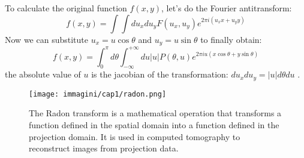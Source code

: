 To calculate the original function \( f(x,y) \), let's do the Fourier antitransform: 
\begin{equation}
    f(x,y) = \int \int du_x du_y F(u_x, u_y) e^{2\pi i (u_x x + u_y y)}
\end{equation}
Now we can substitute \( u_x = u \cos\theta \) and \( u_y = u \sin\theta \) to finally obtain:
\begin{equation}
    f(x,y) = \int_{0}^{\pi} d\theta \int_{-\infty}^{+\infty} du |u| P(\theta, u) e^{2\pi i u (x \cos\theta + y \sin\theta)} 
\end{equation}
the absolute value of \( u \) is the jacobian of the transformation: \( du_x du_y = |u| d\theta du \) .
\begin{figure}[h!]
    \centering
    \texttt{[image: immagini/cap1/radon.png]} 
    \caption{The Radon transform is a mathematical operation that transforms a function defined in the spatial domain into a function defined in the projection domain. It is used in computed tomography to reconstruct images from projection data.} 
    \label{fig:radon_transform}
\end{figure}
